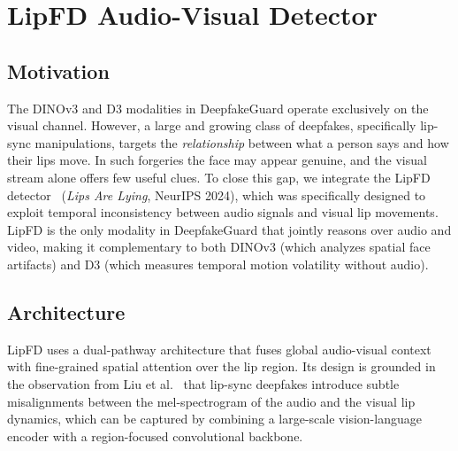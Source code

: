 \documentclass[conference]{IEEEtran}
\begin{document}

\section{LipFD Audio-Visual Detector} \label{sec:lipfd}

\subsection{Motivation}
The DINOv3 and D3 modalities in DeepfakeGuard operate exclusively on the visual channel.  However, a large and growing class of deepfakes, specifically lip-sync manipulations, targets the \emph{relationship} between what a person says and how their lips move.  In such forgeries the face may appear genuine, and the visual stream alone offers few useful clues.  To close this gap, we integrate the LipFD detector~\cite{lipfd2024} (\emph{Lips Are Lying}, NeurIPS 2024), which was specifically designed to exploit temporal inconsistency between audio signals and visual lip movements.  LipFD is the only modality in DeepfakeGuard that jointly reasons over audio and video, making it complementary to both DINOv3 (which analyzes spatial face artifacts) and D3 (which measures temporal motion volatility without audio).

\subsection{Architecture}
LipFD uses a dual-pathway architecture that fuses global audio-visual context with fine-grained spatial attention over the lip region.  Its design is grounded in the observation from Liu et al.~\cite{lipfd2024} that lip-sync deepfakes introduce subtle misalignments between the mel-spectrogram of the audio and the visual lip dynamics, which can be captured by combining a large-scale vision-language encoder with a region-focused convolutional backbone.
\end{document}
